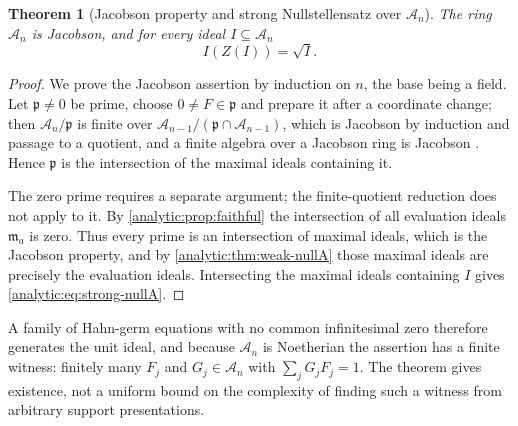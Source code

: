 \documentclass[11pt,letterpaper]{article}
\newtheorem{theorem}{Theorem}[section]
\theoremstyle{definition}
\theoremstyle{remark}
\newcommand{\A}{\mathscr A}
\newcommand{\m}{\mathfrak m}
\newcommand{\pp}{\mathfrak p}
\numberwithin{equation}{section}
\begin{document}
\begin{theorem}[Jacobson property and strong Nullstellensatz over $\A_n$]
\label{analytic:thm:strong-nullA}
The ring $\A_n$ is Jacobson, and for every ideal $I\subseteq\A_n$
\begin{equation}\label{analytic:eq:strong-nullA}
 I(Z(I))=\sqrt I .
\end{equation}
\end{theorem}
\begin{proof}
We prove the Jacobson assertion by induction on $n$, the base being a
field. Let $\pp\ne0$ be prime, choose $0\ne F\in\pp$ and prepare it after a
coordinate change; then $\A_n/\pp$ is finite over
$\A_{n-1}/(\pp\cap\A_{n-1})$, which is Jacobson by induction and passage to
a quotient, and a finite algebra over a Jacobson ring is Jacobson
\cite[\S10.35]{Stacks}. Hence $\pp$ is the intersection of the maximal
ideals containing it.

The zero prime requires a separate argument; the finite-quotient reduction
does not apply to it. By \cref{analytic:prop:faithful} the intersection of
all evaluation ideals $\m_a$ is zero. Thus every prime is an intersection of
maximal ideals, which is the Jacobson property, and by
\cref{analytic:thm:weak-nullA} those maximal ideals are precisely the
evaluation ideals. Intersecting the maximal ideals containing $I$ gives
\eqref{analytic:eq:strong-nullA}.
\end{proof}

A family of Hahn-germ equations with no common infinitesimal zero therefore
generates the unit ideal, and because $\A_n$ is Noetherian the assertion has
a finite witness: finitely many $F_j$ and $G_j\in\A_n$ with
$\sum_jG_jF_j=1$. The theorem gives existence, not a uniform bound on the
complexity of finding such a witness from arbitrary support presentations.
\end{document}
